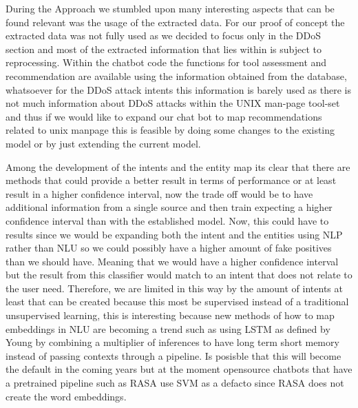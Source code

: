 During the Approach we stumbled upon many interesting aspects that can be found relevant was the usage of the extracted data. For our proof of concept the extracted data was not fully used as we decided to focus only in the DDoS section and most of the extracted information that lies within is subject to reprocessing. Within the chatbot code the functions for tool assessment and recommendation are available using the information obtained from the database, whatsoever for the DDoS attack intents this information is barely used as there is not much information about DDoS attacks within the UNIX man-page tool-set and thus if we would like to expand our chat bot to map recommendations related to unix manpage this is feasible by doing some changes to the existing model or by just extending the current model.

Among the development of the intents and the entity map its clear that there are methods that could provide a better result in terms of performance or at least result in a higher confidence interval, now the trade off would be to have additional information from a single source and then train expecting a higher confidence interval than with the established model. Now, this could have to results since we would be expanding both the intent and the entities using NLP rather than NLU so we could possibly have a higher amount of fake positives than we should have. Meaning that we would have a higher confidence interval but the result from this classifier would match to an intent that does not relate to the user need. Therefore, we are limited in this way by the amount of intents at least that can be created because this most be supervised instead of a traditional unsupervised learning, this is interesting because new methods of how to map embeddings in NLU are becoming a trend such as using LSTM as defined by Young \cite{NLP_LTSM} by combining a multiplier of inferences to have long term short memory instead of passing contexts through a pipeline. Is posisble that this will become the default in the coming years but at the moment opensource chatbots that have a pretrained pipeline such as RASA use SVM as a defacto since RASA does not create the word embeddings.

